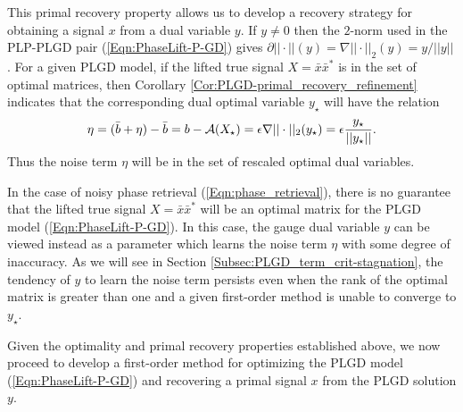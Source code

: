 This primal recovery property allows us to develop a recovery strategy for obtaining a signal $x$ from a dual variable $y$.  If $y \neq 0$ then the $2$-norm used in the PLP-PLGD pair (\ref{Eqn:PhaseLift-P-GD}) gives $\partial ||\cdot||(y) = \nabla ||\cdot||_2(y) = y / ||y||$.  For a given PLGD model, if the lifted true signal $X = \bar{x}\bar{x}^*$ is in the set of optimal matrices, then  Corollary \ref{Cor:PLGD-primal_recovery_refinement} indicates that the corresponding dual optimal variable $y_\star$ will have the relation 
\begin{equation} 			\label{Eqn:PLGD-noise_is_dual_variable}
\eta = (\bar{b} + \eta) - \bar{b} = b - {\mathcal A}(X_\star)  = \epsilon \nabla ||\cdot||_2(y_\star) = \epsilon \frac{y_\star}{||y_\star||}.
\end{equation}
Thus the noise term $\eta$ will be in the set of rescaled optimal dual variables.  

In the case of noisy phase retrieval (\ref{Eqn:phase_retrieval}), there is no guarantee that the lifted true signal $X = \bar{x}\bar{x}^*$ will be an optimal matrix for the PLGD model (\ref{Eqn:PhaseLift-P-GD}).  In this case, the gauge dual variable $y$ can be viewed instead as a parameter which learns the noise term $\eta$ with some degree of inaccuracy.  As we will see in Section \ref{Subsec:PLGD_term_crit-stagnation}, the tendency of $y$ to learn the noise term persists even when the rank of the optimal matrix is greater than one and a given first-order method is unable to converge to $y_\star$.


Given the optimality and primal recovery properties established above, we now proceed to develop a first-order method for optimizing the PLGD model (\ref{Eqn:PhaseLift-P-GD}) and recovering a primal signal $x$ from the PLGD solution $y$.



